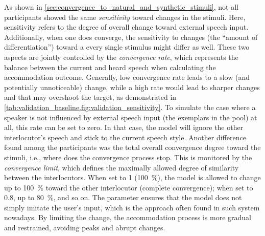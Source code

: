 As shown in \cref{sec:convergence_to_natural_and_synthetic_stimuli}, not all participants showed the same \emph{sensitivity} toward changes in the stimuli.
Here, sensitivity refers to the degree of overall change toward external speech input.
Additionally, when one does converge, the sensitivity to changes (the \enquote{amount of differentiation}) toward a every single stimulus might differ as well.
These two aspects are jointly controlled by the \emph{convergence rate}, which represents the balance between the current and heard speech when calculating the accommodation outcome.
Generally, low convergence rate leads to a slow (and potentially unnoticeable) change, while a high rate would lead to sharper changes and that may overshoot the target, as demonstrated in \cref{tab:validation_baseline,fig:validation_sensitivity}.
To simulate the case where a speaker is not influenced by external speech input (the exemplars in the pool) at all, this rate can be set to zero.
In that case, the model will ignore the other interlocutor's speech and stick to the current speech style.
Another difference found among the participants was the total overall convergence degree toward the stimuli, i.e., where does the convergence process stop.
This is monitored by the \emph{convergence limit}, which defines the maximally allowed degree of similarity between the interlocutors.
When set to 1 (\SI{100}{\percent}), the model is allowed to change up to \SI{100}{\percent} toward the other interlocutor (complete convergence); when set to 0.8, up to \SI{80}{\percent}, and so on.
The parameter ensures that the model does not simply imitate the user's input, which is the approach often found in such system nowadays.
By limiting the change, the accommodation process is more gradual and restrained, avoiding peaks and abrupt changes.


